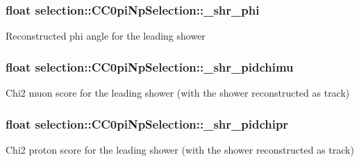 \subsubsection[{\texorpdfstring{\+\_\+shr\+\_\+phi}{_shr_phi}}]{\setlength{\rightskip}{0pt plus 5cm}float selection\+::\+C\+C0pi\+Np\+Selection\+::\+\_\+shr\+\_\+phi\hspace{0.3cm}{\ttfamily [private]}}\hypertarget{classselection_1_1CC0piNpSelection_a8706a83b3dc2e2c3857ada556392f16f}{}\label{classselection_1_1CC0piNpSelection_a8706a83b3dc2e2c3857ada556392f16f}
Reconstructed phi angle for the leading shower 
\subsubsection[{\texorpdfstring{\+\_\+shr\+\_\+pidchimu}{_shr_pidchimu}}]{\setlength{\rightskip}{0pt plus 5cm}float selection\+::\+C\+C0pi\+Np\+Selection\+::\+\_\+shr\+\_\+pidchimu\hspace{0.3cm}{\ttfamily [private]}}\hypertarget{classselection_1_1CC0piNpSelection_a63840908c268c89d30e6728ac6cb1036}{}\label{classselection_1_1CC0piNpSelection_a63840908c268c89d30e6728ac6cb1036}
Chi2 muon score for the leading shower (with the shower reconstructed as track) 
\subsubsection[{\texorpdfstring{\+\_\+shr\+\_\+pidchipr}{_shr_pidchipr}}]{\setlength{\rightskip}{0pt plus 5cm}float selection\+::\+C\+C0pi\+Np\+Selection\+::\+\_\+shr\+\_\+pidchipr\hspace{0.3cm}{\ttfamily [private]}}\hypertarget{classselection_1_1CC0piNpSelection_aae9294d7e4803ff991e611ea124769bc}{}\label{classselection_1_1CC0piNpSelection_aae9294d7e4803ff991e611ea124769bc}
Chi2 proton score for the leading shower (with the shower reconstructed as track) 
